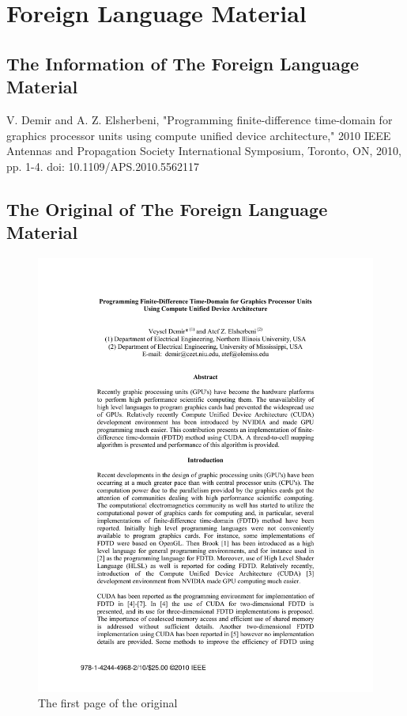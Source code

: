 
\chapter{Foreign Language Material}

\section{The Information of The Foreign Language Material}
V. Demir and A. Z. Elsherbeni, "Programming finite-difference time-domain for graphics processor units using compute unified device architecture," 2010 IEEE Antennas and Propagation Society International Symposium, Toronto, ON, 2010, pp. 1-4. doi: 10.1109/APS.2010.5562117

\section{The Original of The Foreign Language Material}

\begin{figure}[h]
	\centering
	\includegraphics[width=1\linewidth,height=0.8\textheight]{../pics/p01}
	\caption{The first page of the original}
	\label{fig:p01}
\end{figure}

